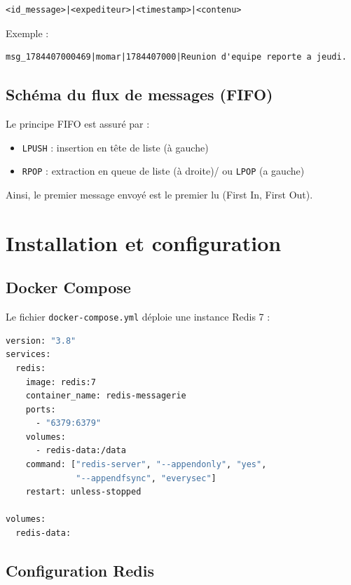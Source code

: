 \documentclass[12pt,a4paper]{article}
\begin{document}
\begin{lstlisting}
<id_message>|<expediteur>|<timestamp>|<contenu>
\end{lstlisting}

Exemple :
\begin{lstlisting}
msg_1784407000469|momar|1784407000|Reunion d'equipe reporte a jeudi.
\end{lstlisting}

\subsection{Sch\'ema du flux de messages (FIFO)}

Le principe FIFO est assur\'e par :
\begin{itemize}
    \item \texttt{LPUSH} : insertion en t\^ete de liste (\`a gauche)
    \item \texttt{RPOP} : extraction en queue de liste (\`a droite)/ ou \texttt{LPOP} (a gauche)
\end{itemize}

Ainsi, le premier message envoy\'e est le premier lu (First In, First Out).



\section{Installation et configuration}

\subsection{Docker Compose}

Le fichier \texttt{docker-compose.yml} d\'eploie une instance Redis 7 :

\begin{lstlisting}[language=bash,caption={docker-compose.yml}]
version: "3.8"
services:
  redis:
    image: redis:7
    container_name: redis-messagerie
    ports:
      - "6379:6379"
    volumes:
      - redis-data:/data
    command: ["redis-server", "--appendonly", "yes",
              "--appendfsync", "everysec"]
    restart: unless-stopped

volumes:
  redis-data:
\end{lstlisting}

\subsection{Configuration Redis}
\end{document}
